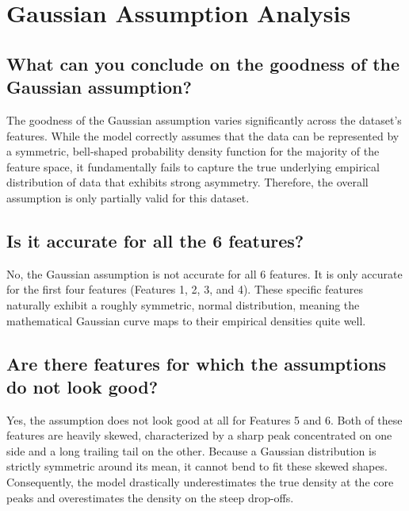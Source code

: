\section{Gaussian Assumption Analysis}

\subsection*{What can you conclude on the goodness of the Gaussian assumption?}
The goodness of the Gaussian assumption varies significantly across the dataset's features. While the model correctly assumes that the data can be represented by a symmetric, bell-shaped probability density function for the majority of the feature space, it fundamentally fails to capture the true underlying empirical distribution of data that exhibits strong asymmetry. Therefore, the overall assumption is only partially valid for this dataset.

\subsection*{Is it accurate for all the 6 features?}
No, the Gaussian assumption is not accurate for all 6 features. It is only accurate for the first four features (Features 1, 2, 3, and 4). These specific features naturally exhibit a roughly symmetric, normal distribution, meaning the mathematical Gaussian curve maps to their empirical densities quite well.

\subsection*{Are there features for which the assumptions do not look good?}
Yes, the assumption does not look good at all for Features 5 and 6. Both of these features are heavily skewed, characterized by a sharp peak concentrated on one side and a long trailing tail on the other. Because a Gaussian distribution is strictly symmetric around its mean, it cannot bend to fit these skewed shapes. Consequently, the model drastically underestimates the true density at the core peaks and overestimates the density on the steep drop-offs.

